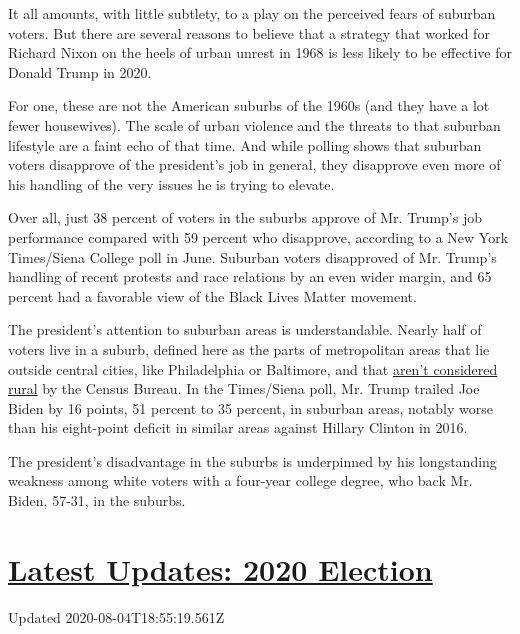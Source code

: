 It all amounts, with little subtlety, to a play on the perceived fears
of suburban voters. But there are several reasons to believe that a
strategy that worked for Richard Nixon on the heels of urban unrest in
1968 is less likely to be effective for Donald Trump in 2020.

For one, these are not the American suburbs of the 1960s (and they have
a lot fewer housewives). The scale of urban violence and the threats to
that suburban lifestyle are a faint echo of that time. And while polling
shows that suburban voters disapprove of the president's job in general,
they disapprove even more of his handling of the very issues he is
trying to elevate.

Over all, just 38 percent of voters in the suburbs approve of Mr.
Trump's job performance compared with 59 percent who disapprove,
according to a New York Times/Siena College poll in June. Suburban
voters disapproved of Mr. Trump's handling of recent protests and race
relations by an even wider margin, and 65 percent had a favorable view
of the Black Lives Matter movement.

The president's attention to suburban areas is understandable. Nearly
half of voters live in a suburb, defined here as the parts of
metropolitan areas that lie outside central cities, like Philadelphia or
Baltimore, and that
\href{https://www.census.gov/programs-surveys/geography/guidance/geo-areas/urban-rural/2010-urban-rural.html}{aren't
considered rural} by the Census Bureau. In the Times/Siena poll, Mr.
Trump trailed Joe Biden by 16 points, 51 percent to 35 percent, in
suburban areas, notably worse than his eight-point deficit in similar
areas against Hillary Clinton in 2016.

The president's disadvantage in the suburbs is underpinned by his
longstanding weakness among white voters with a four-year college
degree, who back Mr. Biden, 57-31, in the suburbs.

\hypertarget{latest-updates-2020-election}{%
\section{\texorpdfstring{\href{https://www.nytimes3xbfgragh.onion/2020/08/04/us/elections/primary-election-michigan-arizona-kansas.html?action=click\&pgtype=Article\&state=default\&region=MAIN_CONTENT_1\&context=storylines_live_updates}{Latest
Updates: 2020
Election}}{Latest Updates: 2020 Election}}\label{latest-updates-2020-election}}

Updated 2020-08-04T18:55:19.561Z

